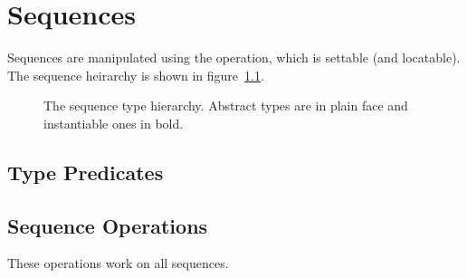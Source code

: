 %
%
%


\chapter{Sequences} \label{Sequences}

Sequences are manipulated using the  operation, which is
settable (and locatable).  The sequence heirarchy is shown in
figure~\ref{fig:seqhier}.


\begin{figure}[h]
\centerline{}
\caption{The sequence type hierarchy.  Abstract types are in plain face
and instantiable ones in bold.} \label{fig:seqhier}
\end{figure}

\section{Type Predicates}



\section{Sequence Operations}

These operations work on all sequences.


